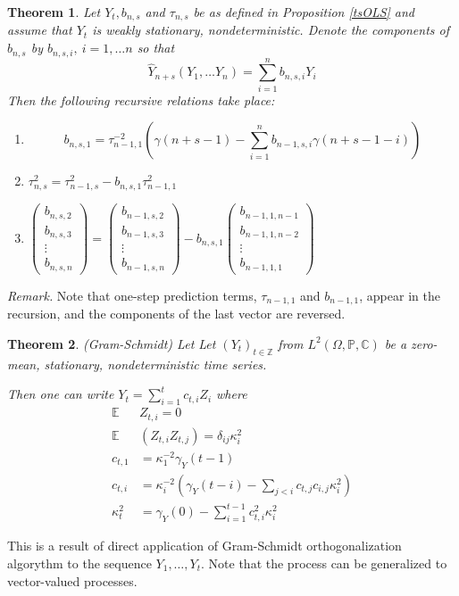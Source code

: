 \documentclass[12pt]{article}
\newtheorem{theorem}{Theorem}[section]
\theoremstyle{definition}
\theoremstyle{remark}
\numberwithin{equation}{section}
\newcommand{\PP}{\mathbb{P}}
\newcommand{\ZZ}{\mathbb{Z}}
\newcommand{\CC}{\mathbb{C}}
\newcommand{\EE}{\mathbb{E}}
\begin{document}
\begin{theorem}
Let $Y_t, b_{n,s}$  and $\tau_{n,s}$ be as defined in Proposition \ref{tsOLS} and assume that $Y_t$ is weakly stationary, nondeterministic. Denote the components of $b_{n,s}$ by $b_{n,s,i},\ i=1,\ldots n$ so that
\begin{equation*}
	\hat Y_{n+s}(Y_1,\ldots Y_n) = \sum_{i = 1}^n b_{n,s,i}Y_i
\end{equation*}
Then the following recursive relations take place:
\begin{enumerate}
	\item $$b_{n,s,1} = \tau_{n-1,1}^{-2}\left(\gamma(n+s-1) - \sum_{i=1}^nb_{n-1,s,i}\gamma(n+s-1-i)\right)$$
	\item $\tau_{n,s}^2 = \tau_{n-1,s}^2 - b_{n,s,1}\tau_{n-1,1}^2$
	\item $
	\begin{pmatrix} b_{n,s,2} \\ b_{n,s,3}\\ \vdots\\b_{n,s,n}\end{pmatrix} =
	\begin{pmatrix} b_{n-1,s,2} \\ b_{n-1,s,3}\\ \vdots\\b_{n-1,s,n} \end{pmatrix} - b_{n,s,1}
	\begin{pmatrix}
		b_{n-1,1,n-1} \\ b_{n-1,1,n-2}\\ \vdots\\b_{n-1,1,1}
	\end{pmatrix}$
\end{enumerate}
\end{theorem}
\noindent\emph{Remark.} Note that one-step prediction terms, $\tau_{n-1,1}$ and $b_{n-1,1}$, appear in the recursion, and the components of the last vector are reversed.

\begin{theorem}\emph{(Gram-Schmidt)} Let
	Let $(Y_t)_{t\in\ZZ}$ from $L^2\left(\Omega, \PP, \CC\right)$ be a zero-mean, stationary, nondeterministic time series.

Then one can write $Y_t = \sum_{i=1}^t c_{t,i}Z_i$ where
\begin{align*}
	\EE& Z_{t,i} = 0\\
	\EE& \left(Z_{t,i}Z_{t,j}\right) =\delta_{ij}\kappa_i^2\\
	c_{t,1} &= \kappa_1^{-2}\gamma_Y(t-1)\\
	c_{t,i} &= \kappa_{i}^{-2}\left(\gamma_Y(t-i) - \sum_{j<i}c_{t,j}c_{i,j}\kappa_i^2\right)\\
	\kappa_t^2 &= \gamma_Y(0) - \sum_{i = 1}^{t-1}c_{t,i}^2\kappa_i^2
\end{align*}
\end{theorem}
\proof This is a result of direct application of Gram-Schmidt orthogonalization algorythm to the sequence $Y_1, \ldots, Y_t$. Note that the process can be generalized to vector-valued processes.
\end{document}
